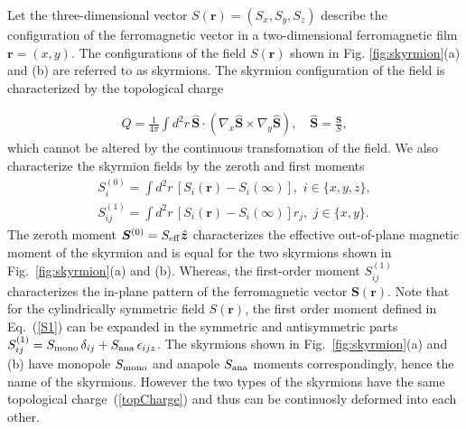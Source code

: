 \documentclass[twocolumn,showpacs,floatfix,nofootinbib,longbibliography]{revtex4-1}
\begin{document}
Let the three-dimensional vector $S(\bm r) = (S_x,S_y,S_z)$ describe the configuration of the ferromagnetic vector in a two-dimensional ferromagnetic film $\bm r = (x,y)$. The configurations of the field $S(\bm r)$ shown in Fig. \ref{fig:skyrmion}(a) and (b) are referred to as skyrmions. The skyrmion configuration of the field is characterized by the topological charge 

\begin{align}
	Q = \frac{1}{4\pi} \int d^2r \, \hat {\bm S}\cdot (\nabla_x\hat {\bm S}\times\nabla_y\hat {\bm S}), \quad \hat {\bm S}= \frac{\bm S}{S}, 
	\label{topCharge}
\end{align}
which cannot be altered by the continuous transfomation of the field.  We also characterize the skyrmion fields by the zeroth and first moments
\begin{align}
	S^{(0)}_i = \int  d^2r \, \left[S_i(\bm r)-S_i(\infty)\right],\,\, i\in \{x,y,z\}, \label{S0} \\
	S^{(1)}_{ij} = \int  d^2r \, \left[S_i(\bm r)-S_i(\infty)\right] r_j,\,\, j\in \{x,y\}. \label{S1}
\end{align}
The zeroth moment $\bm S^{(0)} = S_{\rm eff} \hat{\bm z}$ characterizes the effective out-of-plane magnetic moment of the skyrmion and is equal for the two skyrmions shown in Fig.~{\ref{fig:skyrmion}}(a) and (b). Whereas, the first-order moment $S^{(1)}_{ij}$ characterizes the in-plane pattern of the ferromagnetic vector $\bm S(\bm r)$. Note that for the cylindrically symmetric field $S(\bm r)$, the first order moment defined in Eq.~(\ref{S1}) can be expanded in the symmetric and antisymmetric parts $S^{(1)}_{ij}=S_{\rm mono}\,\delta_{ij} + S_{\rm ana}\,\epsilon_{ijz}$. The skyrmions shown in Fig.~\ref{fig:skyrmion}(a) and (b) have monopole $S_{\rm mono}$ and anapole $S_{\rm ana}$ moments correspondingly, hence the name of the skyrmions. However the two types of the skyrmions have the same topological charge~(\ref{topCharge}) and thus can be continuosly deformed into each other. 

\end{document}
